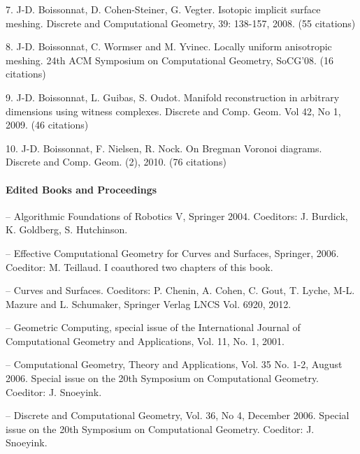 7. J-D. Boissonnat, D. Cohen-Steiner, G. Vegter. Isotopic implicit surface meshing.  Discrete and Computational Geometry,  39: 138-157,  2008. (55 citations)%

8. J-D. Boissonnat, C. Wormser and M. Yvinec. Locally uniform anisotropic meshing. 
24th ACM Symposium on Computational Geometry, SoCG'08.
(16 citations)

9. J-D. Boissonnat, L. Guibas, S. Oudot. Manifold reconstruction in arbitrary dimensions using witness complexes.
Discrete and Comp. Geom. Vol 42, No 1, 2009. (46 citations)


10. J-D. Boissonnat, F. Nielsen, R. Nock. On Bregman Voronoi diagrams.
Discrete and Comp. Geom. (2), 2010. (76 citations)%



\paragraph{Edited Books and Proceedings}  \mbox{}

--
Algorithmic Foundations of Robotics V, Springer 2004. Coeditors:  J. Burdick, 
K. Goldberg, S. Hutchinson.

-- Effective Computational Geometry for Curves and Surfaces,
  Springer, 2006. Coeditor:  M. Teillaud. I coauthored two chapters of this book.

--  Curves and Surfaces.
Coeditors:  P. Chenin, A. Cohen,  C. Gout, T. Lyche, M-L.  Mazure and L. Schumaker,
Springer Verlag LNCS Vol. 6920, 2012.


--
Geometric Computing, special issue of the 
International Journal of Computational Geometry and Applications, Vol. 11, 
No. 1, 2001.


--
Computational Geometry, Theory and Applications, Vol. 35 No. 1-2, August 2006.
Special issue on the 20th Symposium on Computational
Geometry.  Coeditor:   J. Snoeyink.

-- 
Discrete and Computational Geometry, Vol. 36, No 4, December 2006.
Special issue on the 20th Symposium on Computational
Geometry.  Coeditor:   J. Snoeyink.



